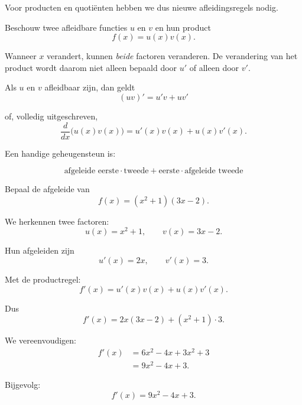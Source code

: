 \documentclass{ximera}
\begin{document}
Voor producten en quotiënten hebben we dus nieuwe afleidingsregels nodig.




Beschouw twee afleidbare functies $u$ en $v$ en hun product
\[
f(x)=u(x)v(x).
\]

Wanneer $x$ verandert, kunnen \emph{beide} factoren veranderen.
De verandering van het product wordt daarom niet alleen bepaald door
$u'$ of alleen door $v'$.

\begin{eigenschap}[Productregel]
Als $u$ en $v$ afleidbaar zijn, dan geldt
\[
\boxed{
(uv)'=u'v+uv'
}
\]

of, volledig uitgeschreven,
\[
\boxed{
\frac{d}{dx}\bigl(u(x)v(x)\bigr)
=
u'(x)v(x)+u(x)v'(x).
}
\]
\end{eigenschap}

Een handige geheugensteun is:

\[
\boxed{
\text{afgeleide eerste}\cdot\text{tweede}
+
\text{eerste}\cdot\text{afgeleide tweede}
}
\]



\begin{voorbeeld}
Bepaal de afgeleide van
\[
f(x)=(x^2+1)(3x-2).
\]

We herkennen twee factoren:
\[
u(x)=x^2+1,
\qquad
v(x)=3x-2.
\]

Hun afgeleiden zijn
\[
u'(x)=2x,
\qquad
v'(x)=3.
\]

Met de productregel:
\[
f'(x)
=
u'(x)v(x)+u(x)v'(x).
\]

Dus
\[
f'(x)
=
2x(3x-2)+(x^2+1)\cdot3.
\]

We vereenvoudigen:
\[
\begin{aligned}
f'(x)
&=6x^2-4x+3x^2+3\\
&=9x^2-4x+3.
\end{aligned}
\]

Bijgevolg:
\[
\boxed{f'(x)=9x^2-4x+3.}
\]
\end{voorbeeld}


\end{document}
